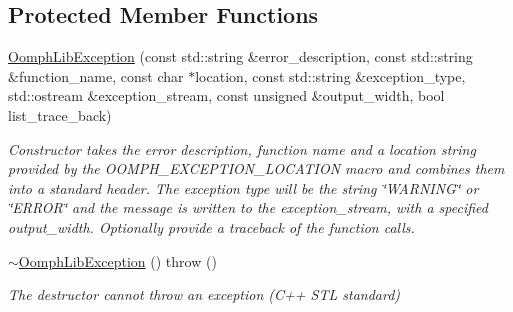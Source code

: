 \subsection*{Protected Member Functions}
\begin{DoxyCompactItemize}
\item 
\hyperlink{classoomph_1_1OomphLibException_a2bcc47316fcc96608e79bec5ab49f82b}{Oomph\+Lib\+Exception} (const std\+::string \&error\+\_\+description, const std\+::string \&function\+\_\+name, const char $\ast$location, const std\+::string \&exception\+\_\+type, std\+::ostream \&exception\+\_\+stream, const unsigned \&output\+\_\+width, bool list\+\_\+trace\+\_\+back)
\begin{DoxyCompactList}\small\item\em Constructor takes the error description, function name and a location string provided by the O\+O\+M\+P\+H\+\_\+\+E\+X\+C\+E\+P\+T\+I\+O\+N\+\_\+\+L\+O\+C\+A\+T\+I\+ON macro and combines them into a standard header. The exception type will be the string \char`\"{}\+W\+A\+R\+N\+I\+N\+G\char`\"{} or \char`\"{}\+E\+R\+R\+O\+R\char`\"{} and the message is written to the exception\+\_\+stream, with a specified output\+\_\+width. Optionally provide a traceback of the function calls. \end{DoxyCompactList}\item 
\hyperlink{classoomph_1_1OomphLibException_a0cc216d83aa854e965c3c8376d2c4d39}{$\sim$\+Oomph\+Lib\+Exception} ()  throw ()
\begin{DoxyCompactList}\small\item\em The destructor cannot throw an exception (C++ S\+TL standard) \end{DoxyCompactList}\end{DoxyCompactItemize}

